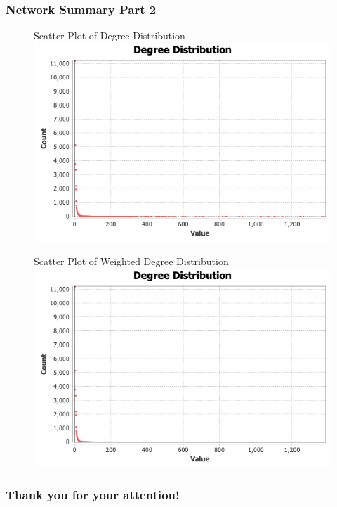 \documentclass{beamer}
\begin{document}
\begin{frame}
\frametitle{Network Summary Part 2}
	\begin{multicols}{2}
		\begin{figure}
	        {\tiny Scatter Plot of Degree Distribution}
		\includegraphics[width=\columnwidth]{degree-distribution.png}
		\end{figure}
		\columnbreak
		\begin{figure}
		{\tiny Scatter Plot of  Weighted Degree Distribution}
		\includegraphics[width=\columnwidth]{w-degree-distribution.png}
		\end{figure}
	\end{multicols}
\end{frame}




\begin{frame}[c]
\begin{center}
\frametitle{\LARGE Thank you for your attention!}

{\LARGE \inserttitle}

\bigskip

{\insertauthor} 

\bigskip\bigskip

{\insertinstitute}

\bigskip\bigskip

{\large \insertdate}
\end{center}
\end{frame}
\end{document}
